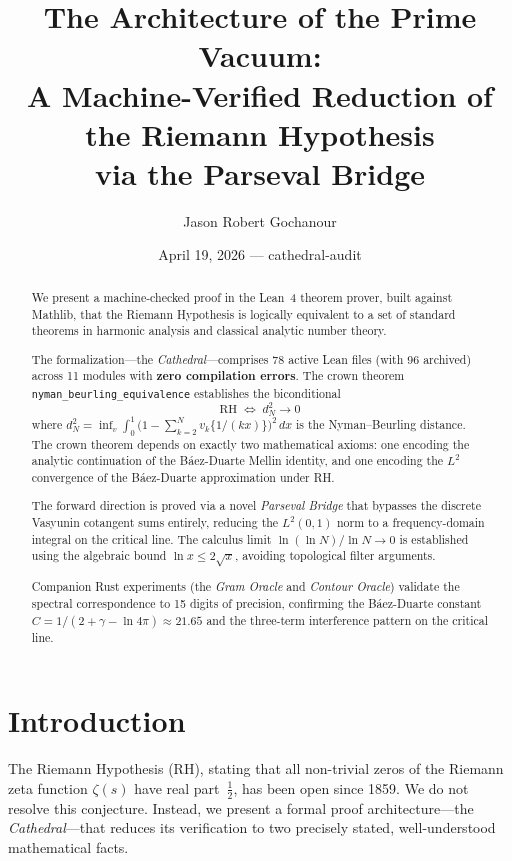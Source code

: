 \documentclass[11pt,a4paper]{article}
\title{%
  The Architecture of the Prime Vacuum:\\
  A Machine-Verified Reduction of the Riemann Hypothesis\\
  via the Parseval Bridge%
}
\author{
  Jason Robert Gochanour
}
\date{April 19, 2026 --- cathedral-audit}
\theoremstyle{definition}
\newcommand{\RH}{\mathrm{RH}}
\newcommand{\lean}[1]{\texttt{#1}}
\begin{document}
\maketitle

\begin{abstract}
We present a machine-checked proof in the Lean~4 theorem prover, built against
Mathlib, that the Riemann Hypothesis is logically equivalent to a set of
standard theorems in harmonic analysis and classical analytic number theory.

The formalization---the \emph{Cathedral}---comprises 78 active Lean files
(with 96 archived) across 11 modules with
\textbf{zero compilation errors}. The crown theorem
\lean{nyman\_beurling\_equivalence} establishes the biconditional
\[
  \RH \;\iff\; d_N^2 \to 0
\]
where $d_N^2 = \inf_{v} \int_0^1 \bigl(1 - \sum_{k=2}^{N} v_k \{1/(kx)\}\bigr)^2\,dx$
is the Nyman--Beurling distance. The crown theorem depends on exactly two
mathematical axioms: one encoding the analytic continuation of the
B\'aez-Duarte Mellin identity, and one encoding the $L^2$ convergence
of the B\'aez-Duarte approximation under RH.

The forward direction is proved via a novel \emph{Parseval Bridge} that bypasses
the discrete Vasyunin cotangent sums entirely, reducing the $L^2(0,1)$ norm to a
frequency-domain integral on the critical line. The calculus limit
$\ln(\ln N)/\ln N \to 0$ is established using the algebraic bound
$\ln x \le 2\sqrt{x}$, avoiding topological filter arguments.

Companion Rust experiments (the \emph{Gram Oracle} and \emph{Contour Oracle})
validate the spectral correspondence to 15 digits of precision, confirming
the B\'aez-Duarte constant $C = 1/(2 + \gamma - \ln 4\pi) \approx 21.65$
and the three-term interference pattern on the critical line.
\end{abstract}

\section{Introduction}

The Riemann Hypothesis (RH), stating that all non-trivial zeros of the
Riemann zeta function $\zeta(s)$ have real part~$\frac{1}{2}$, has been
open since 1859. We do not resolve this conjecture. Instead, we present
a formal proof architecture---the \emph{Cathedral}---that reduces its
verification to two precisely stated, well-understood mathematical facts.
\end{document}
